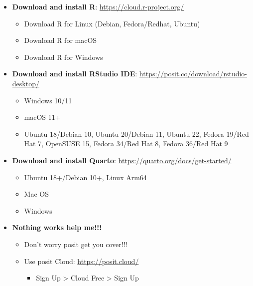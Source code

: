 \documentclass[
  ignorenonframetext,
]{beamer}
\providecommand{\tightlist}{%
  \setlength{\itemsep}{0pt}\setlength{\parskip}{0pt}}\usepackage{longtable,booktabs,array}
\begin{document}
\begin{frame}{}
\label{section-6}
\begin{itemize}
\item
  \textbf{Download and install R}: \url{https://cloud.r-project.org/}

  \begin{itemize}
  \tightlist
  \item
    Download R for Linux (Debian, Fedora/Redhat, Ubuntu)
  \item
    Download R for macOS
  \item
    Download R for Windows
  \end{itemize}
\item
  \textbf{Download and install RStudio IDE}:
  \url{https://posit.co/download/rstudio-desktop/}

  \begin{itemize}
  \tightlist
  \item
    Windows 10/11
  \item
    macOS 11+
  \item
    Ubuntu 18/Debian 10, Ubuntu 20/Debian 11, Ubuntu 22, Fedora 19/Red
    Hat 7, OpenSUSE 15, Fedora 34/Red Hat 8, Fedora 36/Red Hat 9
  \end{itemize}
\end{itemize}
\end{frame}

\begin{frame}{}
\label{section-7}
\begin{itemize}
\item
  \textbf{Download and install Quarto}:
  \url{https://quarto.org/docs/get-started/}

  \begin{itemize}
  \tightlist
  \item
    Ubuntu 18+/Debian 10+, Linux Arm64
  \item
    Mac OS
  \item
    Windows
  \end{itemize}
\item
  \textbf{Nothing works help me!!!}

  \begin{itemize}
  \item
    Don't worry posit get you cover!!!
  \item
    Use posit Cloud: \url{https://posit.cloud/}

    \begin{itemize}
    \tightlist
    \item
      Sign Up \textgreater{} Cloud Free \textgreater{} Sign Up
    \end{itemize}
  \end{itemize}
\end{itemize}
\end{frame}
\end{document}
